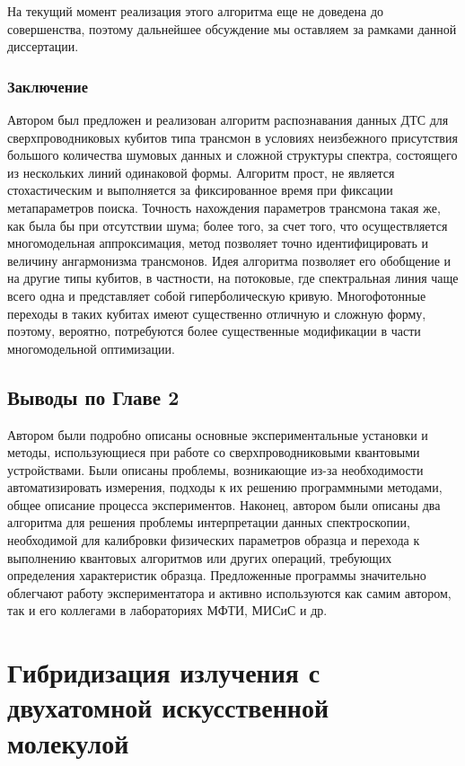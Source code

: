 \documentclass[14pt, a4paper]{extreport}
\numberwithin{equation}{section}
\begin{document}
На текущий момент реализация этого алгоритма еще не доведена до совершенства, поэтому дальнейшее обсуждение мы оставляем за рамками данной диссертации.

\subsection{Заключение}

Автором был предложен и реализован алгоритм распознавания данных ДТС для сверхпроводниковых кубитов типа трансмон в условиях неизбежного присутствия большого количества шумовых данных и сложной структуры спектра, состоящего из нескольких линий одинаковой формы. Алгоритм прост, не является стохастическим и выполняется за фиксированное время при фиксации метапараметров поиска. Точность нахождения параметров трансмона такая же, как была бы при отсутствии шума; более того, за счет того, что осуществляется многомодельная аппроксимация, метод позволяет точно идентифицировать и величину ангармонизма трансмонов. Идея алгоритма позволяет его обобщение и на другие типы кубитов, в частности, на потоковые, где спектральная линия чаще всего одна и представляет собой гиперболическую кривую. Многофотонные переходы в таких кубитах имеют существенно отличную и сложную форму, поэтому, вероятно, потребуются более существенные модификации в части многомодельной оптимизации.

\section{Выводы по Главе 2}

Автором были подробно описаны основные экспериментальные установки и методы, использующиеся при работе со сверхпроводниковыми квантовыми устройствами. Были описаны проблемы, возникающие из-за необходимости автоматизировать измерения, подходы к их решению программными методами, общее описание процесса экспериментов. Наконец, автором были описаны два алгоритма для решения проблемы интерпретации данных спектроскопии, необходимой для калибровки физических параметров образца и перехода к выполнению квантовых алгоритмов или других операций, требующих определения характеристик образца. Предложенные программы значительно облегчают работу экспериментатора и активно используются как самим автором, так и его коллегами в лабораториях МФТИ, МИСиС и др.

\chapter{Гибридизация излучения с двухатомной искусственной молекулой}
\end{document}
